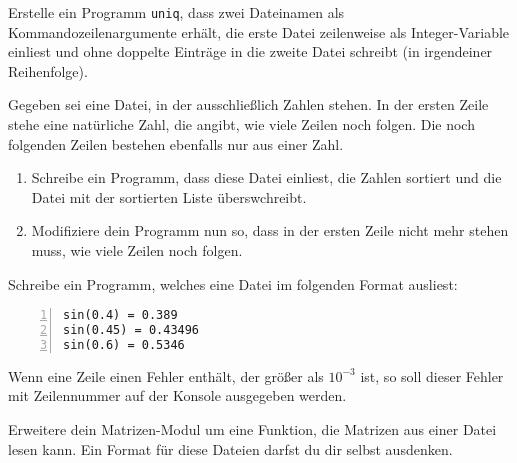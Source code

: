 \documentclass{uebungszettel}
\begin{document}
\begin{aufg}
Erstelle ein Programm \verb|uniq|, dass zwei Dateinamen als Kommandozeilenargumente erhält, die erste Datei zeilenweise als Integer-Variable einliest und ohne doppelte Einträge in die zweite Datei schreibt (in irgendeiner Reihenfolge).
\end{aufg}

\begin{aufg}
Gegeben sei eine Datei, in der ausschließlich Zahlen stehen. In der ersten Zeile stehe eine natürliche Zahl, die angibt, wie viele Zeilen noch folgen. Die noch folgenden Zeilen bestehen ebenfalls nur aus einer Zahl. 
\begin{enumerate}
\item Schreibe ein Programm, dass diese Datei einliest, die Zahlen sortiert und die Datei mit der sortierten Liste überswchreibt.
\item Modifiziere dein Programm nun so, dass in der ersten Zeile nicht mehr stehen muss, wie viele Zeilen noch folgen.\end{enumerate}
\end{aufg}

\begin{aufg}
Schreibe ein Programm, welches eine Datei im folgenden Format ausliest:
\medskip \begin{codelisting}
\begin{lstlisting}[numbers=left,numberstyle=\tiny,frame=tlrb,mathescape=true]
sin(0.4) = 0.389
sin(0.45) = 0.43496
sin(0.6) = 0.5346
\end{lstlisting}
\end{codelisting}
Wenn eine Zeile einen Fehler enthält, der größer als $10^{-3}$ ist, so soll dieser Fehler mit Zeilennummer auf der Konsole ausgegeben werden.
\end{aufg}

\begin{aufg} Erweitere dein Matrizen-Modul um eine Funktion, die Matrizen aus einer Datei lesen kann. Ein Format für diese Dateien darfst du dir selbst ausdenken.
\end{aufg}
\end{document}
